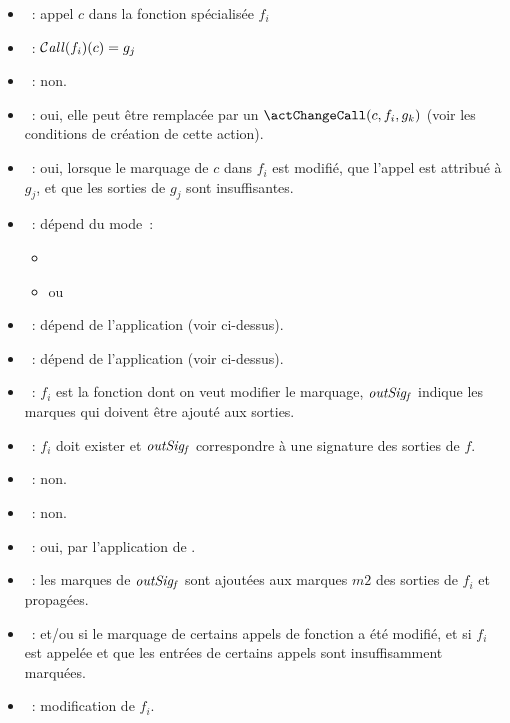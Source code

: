 \begin{itemize}
  \item \param~: appel $c$ dans la fonction spécialisée $f_i$
  \item \precond~: $\operatorname{\mathcal{C\mathit{all}}}(f_i)(c) = g_j$
  \item \creable~: non.
  \item \modifiable~: oui, elle peut être remplacée par un 
    $\actChangeCall(c, f_i, g_k)$ 
    (voir les conditions de création de cette action).
  \item \generable~: oui, lorsque le marquage de  $c$ dans $f_i$ est modifié,
    que l'appel est attribué à $g_j$, et que les sorties de $g_j$
    sont insuffisantes.
  \item \application~: dépend du mode~:
    \begin{itemize}
      \item \actAddOutputMarks{}
      \item ou \actChooseCall{}
    \end{itemize}
  \item \genere~: dépend de l'application (voir ci-dessus).
  \item \modifie~: dépend de l'application (voir ci-dessus).
\end{itemize}


\begin{itemize}
  \item \param~: $f_i$ est la fonction dont on veut modifier le marquage,
     $\mathit{outSig_f}$ indique les marques qui doivent être ajouté aux sorties.
  \item \precond~: $f_i$ doit exister et $\mathit{outSig_f}$ correspondre à une signature
    des sorties de $f$.
  \item \creable~: non.
  \item \modifiable~: non.
  \item \generable~: oui, par l'application de \actMissingOutputs.
  \item \application~: 
    les marques de $\mathit{outSig_f}$ sont ajoutées aux marques $m2$ des
    sorties de $f_i$ et propagées.
  \item \genere~: 
    \actChooseCall{} et/ou \actMissingOutputs{} si le marquage de
    certains appels de fonction a été modifié, et \actMissingInputs{} si
    $f_i$ est appelée et que les entrées de certains appels sont insuffisamment
    marquées.
  \item \modifie~: modification de $f_i$.
\end{itemize}

